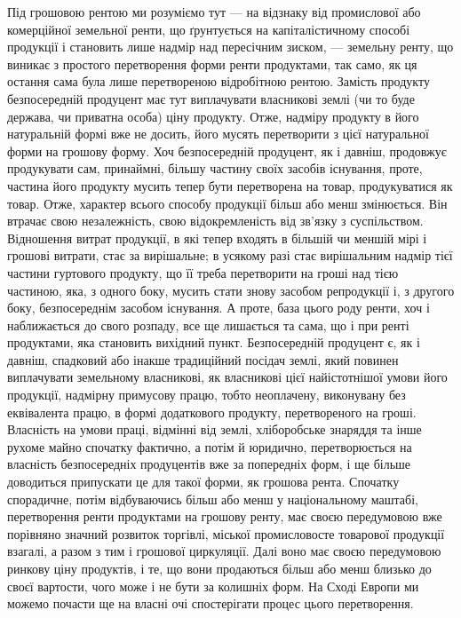 Під грошовою рентою ми розуміємо тут — на відзнаку від промислової
або комерційної земельної ренти, що ґрунтується на капіталістичному способі
продукції і становить лише надмір над пересічним зиском, — земельну ренту,
що виникає з простого перетворення форми ренти продуктами, так само, як ця
остання сама була лише перетвореною відробітною рентою. Замість продукту
безпосередній продуцент має тут виплачувати власникові землі (чи то буде
держава, чи приватна особа) ціну продукту. Отже, надміру продукту в його
натуральній формі вже не досить, його мусять перетворити з цієї натуральної
форми на грошову форму. Хоч безпосередній продуцент, як і давніш, продовжує
продукувати сам, принаймні, більшу частину своїх засобів існування, проте,
частина його продукту мусить тепер бути перетворена на товар, продукуватися
як товар. Отже, характер всього способу продукції більш або менш змінюється.
Він втрачає свою незалежність, свою відокремленість від зв'язку з суспільством.
Відношення витрат продукції, в які тепер входять в більшій чи меншій мірі і
грошові витрати, стає за вирішальне; в усякому разі стає вирішальним
надмір тієї частини гуртового продукту, що її треба перетворити на гроші
над тією частиною, яка, з одного боку, мусить стати знову засобом репродукції
і, з другого боку, безпосереднім засобом існування. А проте, база цього
роду ренти, хоч і наближається до свого розпаду, все ще лишається та сама,
що і при ренті продуктами, яка становить вихідний пункт. Безпосередній продуцент
є, як і давніш, спадковий або інакше традиційний посідач землі, який
повинен виплачувати земельному власникові, як власникові цієї найістотнішої
умови його продукції, надмірну примусову працю, тобто неоплачену, виконувану
без еквівалента працю, в формі додаткового продукту, перетвореного на
гроші. Власність на умови праці, відмінні від землі, хліборобське знаряддя та
інше рухоме майно спочатку фактично, а потім й юридично, перетворюється на
власність безпосередніх продуцентів вже за попередніх форм, і ще більше доводиться
припускати це для такої форми, як грошова рента. Спочатку спорадичне,
потім відбуваючись більш або менш у національному маштабі, перетворення
ренти продуктами на грошову ренту, має своєю передумовою вже порівняно
значний розвиток торгівлі, міської промисловосте товарової продукції взагалі, а
разом з тим і грошової циркуляції. Далі воно має своєю передумовою ринкову
ціну продуктів, і те, що вони продаються більш або менш близько до
своєї вартости, чого може і не бути за колишніх форм. На Сході Европи ми
можемо почасти ще на власні очі спостерігати процес цього перетворення.
\parbreak{}  %
